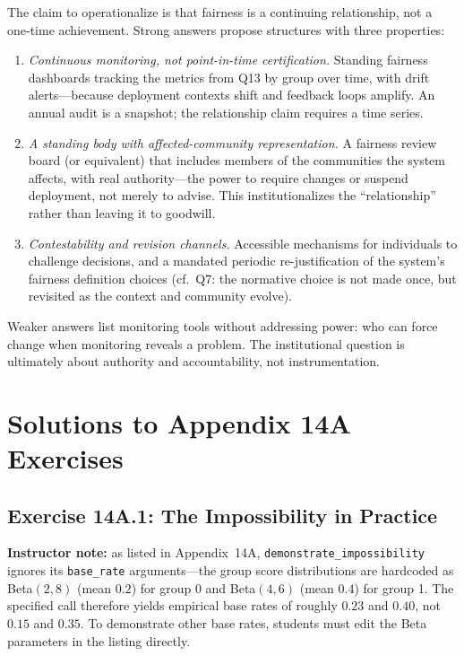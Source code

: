 The claim to operationalize is that fairness is a continuing relationship, not a one-time achievement. Strong answers propose structures with three properties:

\begin{enumerate}
    \item \textit{Continuous monitoring, not point-in-time certification.} Standing fairness dashboards tracking the metrics from Q13 by group over time, with drift alerts---because deployment contexts shift and feedback loops amplify. An annual audit is a snapshot; the relationship claim requires a time series.
    \item \textit{A standing body with affected-community representation.} A fairness review board (or equivalent) that includes members of the communities the system affects, with real authority---the power to require changes or suspend deployment, not merely to advise. This institutionalizes the ``relationship'' rather than leaving it to goodwill.
    \item \textit{Contestability and revision channels.} Accessible mechanisms for individuals to challenge decisions, and a mandated periodic re-justification of the system's fairness definition choices (cf.~Q7: the normative choice is not made once, but revisited as the context and community evolve).
\end{enumerate}

Weaker answers list monitoring tools without addressing power: who can force change when monitoring reveals a problem. The institutional question is ultimately about authority and accountability, not instrumentation.

\section*{Solutions to Appendix 14A Exercises}

\subsection*{Exercise 14A.1: The Impossibility in Practice}

\textbf{Instructor note:} as listed in Appendix~14A, \texttt{demonstrate\_impossibility} ignores its \texttt{base\_rate} arguments---the group score distributions are hardcoded as Beta$(2,8)$ (mean $0.2$) for group 0 and Beta$(4,6)$ (mean $0.4$) for group 1. The specified call therefore yields empirical base rates of roughly $0.23$ and $0.40$, not $0.15$ and $0.35$. To demonstrate other base rates, students must edit the Beta parameters in the listing directly.

